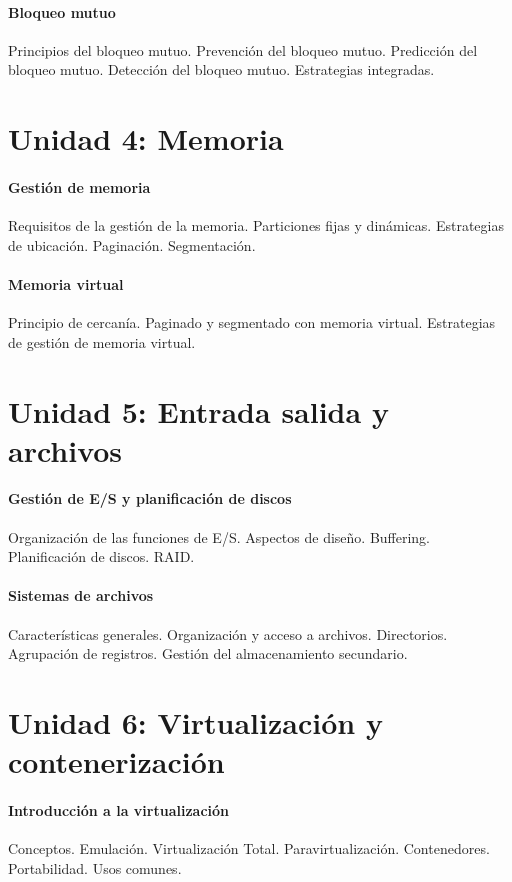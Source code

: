 \paragraph*{Bloqueo mutuo} Principios del bloqueo mutuo. Prevención del bloqueo mutuo. Predicción del bloqueo mutuo. Detección del bloqueo mutuo. Estrategias integradas.

\section*{Unidad 4: Memoria}

\paragraph*{Gestión de memoria} Requisitos de la gestión de la memoria. Particiones fijas y dinámicas. Estrategias de ubicación. Paginación. Segmentación.

\paragraph*{Memoria virtual} Principio de cercanía. Paginado y segmentado con memoria virtual. Estrategias de gestión de memoria virtual.

\section*{Unidad 5: Entrada salida y archivos}

\paragraph*{Gestión de E/S y planificación de discos} Organización de las funciones de E/S. Aspectos de diseño. Buffering. Planificación de discos. RAID.

\paragraph*{Sistemas de archivos} Características generales. Organización y acceso a archivos. Directorios. Agrupación de registros. Gestión del almacenamiento secundario.

\section*{Unidad 6: Virtualización y contenerización}

\paragraph*{Introducción a la virtualización} Conceptos. Emulación. Virtualización Total. Paravirtualización. Contenedores. Portabilidad. Usos comunes.

